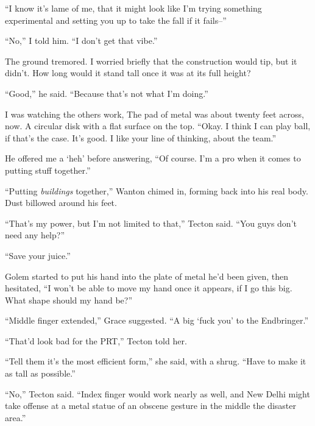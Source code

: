 ``I know it's lame of me, that it might look like I'm trying something experimental and setting you up to take the fall if it fails--''



``No,'' I told him.  ``I don't get that vibe.''



The ground tremored.  I worried briefly that the construction would tip, but it didn't.  How long would it stand tall once it was at its full height?



``Good,'' he said.  ``Because that's not what I'm doing.''



I was watching the others work, The pad of metal was about twenty feet across, now.  A circular disk with a flat surface on the top.  ``Okay.  I think I can play ball, if that's the case.  It's good.  I like your line of thinking, about the team.''



He offered me a `heh' before answering, ``Of course.  I'm a pro when it comes to putting stuff together.''



``Putting \emph{buildings }together,'' Wanton chimed in, forming back into his real body.  Dust billowed around his feet.



``That's my power, but I'm not limited to that,'' Tecton said.  ``You guys don't need any help?''



``Save your juice.''



Golem started to put his hand into the plate of metal he'd been given, then hesitated, ``I won't be able to move my hand once it appears, if I go this big.  What shape should my hand be?''



``Middle finger extended,'' Grace suggested.  ``A big `fuck you' to the Endbringer.''



``That'd look bad for the PRT,'' Tecton told her.



``Tell them it's the most efficient form,'' she said, with a shrug.  ``Have to make it as tall as possible.''



``No,'' Tecton said.  ``Index finger would work nearly as well, and New Delhi might take offense at a metal statue of an obscene gesture in the middle the disaster area.''



